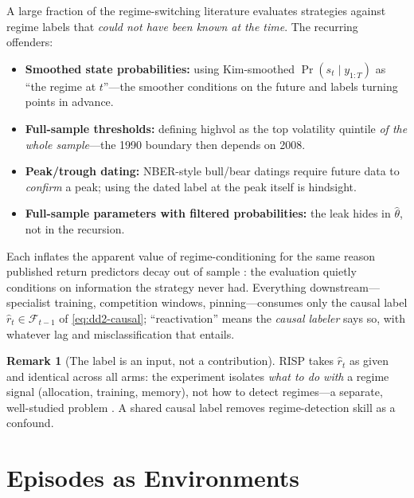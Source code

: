 \documentclass[11pt,a4paper]{article}
\theoremstyle{definition}
\newtheorem{remark}{Remark}[section]
\theoremstyle{plain}
\newcommand{\nm}{\textsc{RISP}}
\begin{document}
\begin{warning}[title={Label leakage: the classic regime-paper sin}]
A large fraction of the regime-switching literature evaluates strategies
against regime labels that \emph{could not have been known at the time}. The
recurring offenders:
\begin{itemize}
  \item \textbf{Smoothed state probabilities:} using Kim-smoothed
        $\Pr(s_t \mid y_{1:T})$ as ``the regime at $t$''---the smoother
        conditions on the future and labels turning points in advance.
  \item \textbf{Full-sample thresholds:} defining \textsf{highvol} as the
        top volatility quintile \emph{of the whole sample}---the 1990
        boundary then depends on 2008.
  \item \textbf{Peak/trough dating:} NBER-style bull/bear datings require
        future data to \emph{confirm} a peak; using the dated label at the
        peak itself is hindsight.
  \item \textbf{Full-sample parameters with filtered probabilities:} the
        leak hides in $\hat\theta$, not in the recursion.
\end{itemize}
Each inflates the apparent value of regime-conditioning for the same reason
published return predictors decay out of sample \citep{mclean2016does}: the
evaluation quietly conditions on information the strategy never had.
Everything downstream---specialist training, competition windows,
pinning---consumes only the causal label
$\hat r_t \in \mathcal{F}_{t-1}$ of \eqref{eq:dd2-causal}; ``reactivation''
means the \emph{causal labeler} says so, with whatever lag and
misclassification that entails.
\end{warning}

\begin{remark}[The label is an input, not a contribution]
\nm{} takes $\hat r_t$ as given and identical across all arms: the
experiment isolates \emph{what to do with} a regime signal (allocation,
training, memory), not how to detect regimes---a separate, well-studied
problem \citep{nystrup2018dynamic, nystrup2020greedy}. A shared causal label
removes regime-detection skill as a confound.
\end{remark}

\section{Episodes as Environments}
\label{sec:dd2-episodes}
\end{document}

